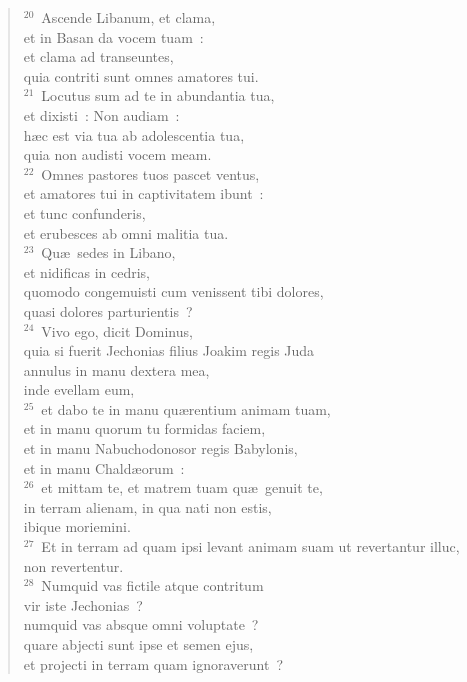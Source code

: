 \begin{flushleft}\begin{verse}${}^{20}$~Ascende Libanum, et clama,\\ et in Basan da vocem tuam~:\\ et clama ad transeuntes,\\ quia contriti sunt omnes amatores tui.\\
${}^{21}$~Locutus sum ad te in abundantia tua,\\ et dixisti~: Non audiam~:\\ h\ae c est via tua ab adolescentia tua,\\ quia non audisti vocem meam.\\
${}^{22}$~Omnes pastores tuos pascet ventus,\\ et amatores tui in captivitatem ibunt~:\\ et tunc confunderis,\\ et erubesces ab omni malitia tua.\\
${}^{23}$~Qu\ae\ sedes in Libano,\\ et nidificas in cedris,\\ quomodo congemuisti cum venissent tibi dolores,\\ quasi dolores parturientis~?\\
${}^{24}$~Vivo ego, dicit Dominus,\\ quia si fuerit Jechonias filius Joakim regis Juda\\ annulus in manu dextera mea,\\ inde evellam eum,\\
${}^{25}$~et dabo te in manu qu\ae rentium animam tuam,\\ et in manu quorum tu formidas faciem,\\ et in manu Nabuchodonosor regis Babylonis,\\ et in manu Chald\ae orum~:\\
${}^{26}$~et mittam te, et matrem tuam qu\ae\ genuit te,\\ in terram alienam, in qua nati non estis,\\ ibique moriemini.\\
${}^{27}$~Et in terram ad quam ipsi levant animam suam ut revertantur illuc,\\ non revertentur.\\
${}^{28}$~Numquid vas fictile atque contritum\\ vir iste Jechonias~?\\ numquid vas absque omni voluptate~?\\ quare abjecti sunt ipse et semen ejus,\\ et projecti in terram quam ignoraverunt~?\\

\end{verse}
\end{flushleft}
